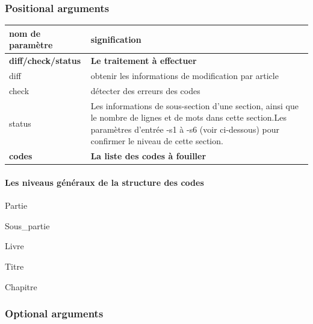 \documentclass[
  oneside]{book}
\begin{document}
\hypertarget{positional-arguments}{%
\subsubsection{Positional arguments}\label{positional-arguments}}

\begin{longtable}[]{@{}
  >{\raggedright\arraybackslash}p{}
  >{\raggedright\arraybackslash}p{}@{}}
\toprule
nom de paramètre & signification \\
\midrule
\endhead
\textbf{diff/check/status } & \textbf{Le traitement à effectuer} \\
diff & obtenir les informations de modification par article \\
check & détecter des erreurs des codes \\
status & Les informations de sous-section d'une section, ainsi que le nombre de lignes et de mots dans cette section.Les paramètres d'entrée -s1 à -s6 (voir ci-dessous) pour confirmer le niveau de cette section. \\
\textbf{codes } & \textbf{La liste des codes à fouiller} \\
\bottomrule
\end{longtable}

\hypertarget{les-niveaus-guxe9nuxe9raux-de-la-structure-des-codes}{%
\paragraph{Les niveaus généraux de la structure des codes}\label{les-niveaus-guxe9nuxe9raux-de-la-structure-des-codes}}

Partie

Sous\_partie

Livre

Titre

Chapitre

\hypertarget{optional-arguments}{%
\subsubsection{Optional arguments}\label{optional-arguments}}
\end{document}
